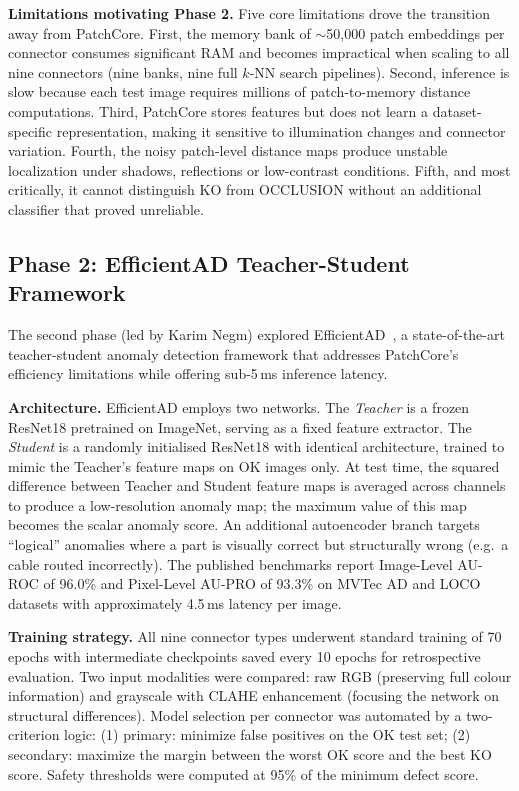 \documentclass[11pt,a4paper,draft]{article}
\begin{document}
\textbf{Limitations motivating Phase 2.} Five core limitations drove the transition away from PatchCore. First, the memory bank of $\sim$50{,}000 patch embeddings per connector consumes significant RAM and becomes impractical when scaling to all nine connectors (nine banks, nine full $k$-NN search pipelines). Second, inference is slow because each test image requires millions of patch-to-memory distance computations. Third, PatchCore stores features but does not learn a dataset-specific representation, making it sensitive to illumination changes and connector variation. Fourth, the noisy patch-level distance maps produce unstable localization under shadows, reflections or low-contrast conditions. Fifth, and most critically, it cannot distinguish KO from OCCLUSION without an additional classifier that proved unreliable.

\subsection{Phase 2: EfficientAD Teacher-Student Framework}

The second phase (led by Karim Negm) explored EfficientAD~\cite{batzner2023efficientad}, a state-of-the-art teacher-student anomaly detection framework that addresses PatchCore's efficiency limitations while offering sub-5\,ms inference latency.

\textbf{Architecture.} EfficientAD employs two networks. The \emph{Teacher} is a frozen ResNet18 pretrained on ImageNet, serving as a fixed feature extractor. The \emph{Student} is a randomly initialised ResNet18 with identical architecture, trained to mimic the Teacher's feature maps on OK images only. At test time, the squared difference between Teacher and Student feature maps is averaged across channels to produce a low-resolution anomaly map; the maximum value of this map becomes the scalar anomaly score. An additional autoencoder branch targets ``logical'' anomalies where a part is visually correct but structurally wrong (e.g.\ a cable routed incorrectly). The published benchmarks report Image-Level AU-ROC of 96.0\% and Pixel-Level AU-PRO of 93.3\% on MVTec AD and LOCO datasets with approximately 4.5\,ms latency per image.

\textbf{Training strategy.} All nine connector types underwent standard training of 70 epochs with intermediate checkpoints saved every 10 epochs for retrospective evaluation. Two input modalities were compared: raw RGB (preserving full colour information) and grayscale with CLAHE enhancement (focusing the network on structural differences). Model selection per connector was automated by a two-criterion logic: (1) primary: minimize false positives on the OK test set; (2) secondary: maximize the margin between the worst OK score and the best KO score. Safety thresholds were computed at 95\% of the minimum defect score.
\end{document}
